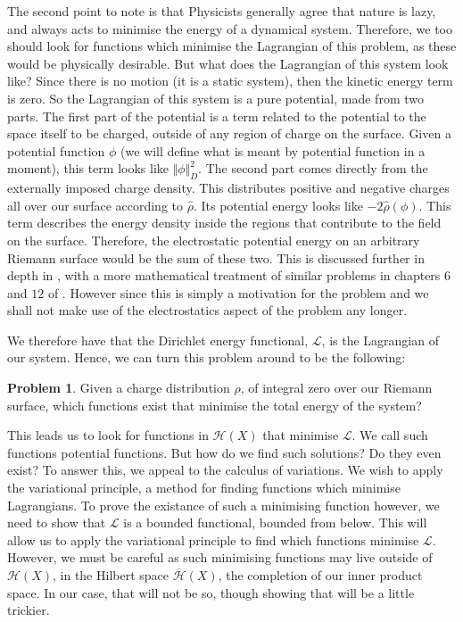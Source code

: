 \documentclass[11pt]{report}
\theoremstyle{definition}
\newtheorem*{problem}{Problem}
\begin{document}
The second point to note is that Physicists generally agree that nature is lazy, and always acts to minimise the energy of a dynamical system. Therefore, we too should look for functions which minimise the Lagrangian of this problem, as these would be physically desirable. But what does the Lagrangian of this system look like? Since there is no motion (it is a static system), then the kinetic energy term is zero. So the Lagrangian of this system is a pure potential, made from two parts. The first part of the potential is a term related to the potential to the space itself to be charged, outside of any region of charge on the surface. Given a potential function $\phi$ (we will define what is meant by potential function in a moment), this term looks like $\Vert \phi \Vert_D^2$. The second part comes directly from the externally imposed charge density. This distributes positive and negative charges all over our surface according to $\hat{\rho}$. Its potential energy looks like $-2\hat{\rho}(\phi)$. This term describes the energy density inside the regions that contribute to the field on the surface. Therefore, the electrostatic potential energy on an arbitrary Riemann surface would be the sum of these two. This is discussed further in depth in \cite{electromagentismBook}, with a more mathematical treatment of similar problems in chapters $6$ and $12$ of \cite{arnold}. However since this is simply a motivation for the problem and we shall not make use of the electrostatics aspect of the problem any longer.

We therefore have that the Dirichlet energy functional, $\mathcal{L}$, is the Lagrangian of our system. Hence, we can turn this problem around to be the following:
\begin{problem}
  Given a charge distribution $\rho$, of integral zero over our Riemann surface, which functions exist that minimise the total energy of the system?
\end{problem}
This leads us to look for functions in $\mathcal{H}(X)$ that minimise $\mathcal{L}$. We call such functions potential functions. But how do we find such solutions? Do they even exist? To answer this, we appeal to the calculus of variations. We wish to apply the variational principle, a method for finding functions which minimise Lagrangians. To prove the existance of such a minimising function however, we need to show that $\mathcal{L}$ is a bounded functional, bounded from below. This will allow us to apply the variational principle to find which functions minimise $\mathcal{L}$. However, we must be careful as such minimising functions may live outside of $\mathcal{H}(X)$, in the Hilbert space $\overline{\mathcal{H}}(X)$, the completion of our inner product space. In our case, that will not be so, though showing that will be a little trickier.
\end{document}
